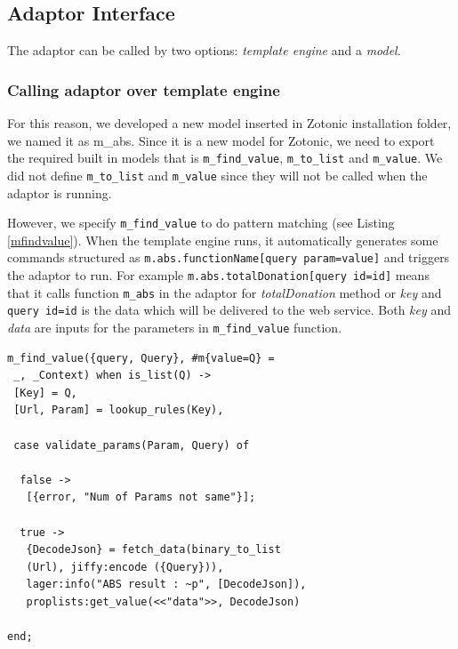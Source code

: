 \documentclass[conference]{IEEEtran}
\begin{document}
%

\subsection{Adaptor Interface}
The adaptor can be called by two options: \textit{template engine} and a \textit{model}. 

\subsubsection{Calling adaptor over template engine}
For this reason, we developed a new model inserted in Zotonic installation folder, we named it as m\_abs. Since it is a new model for Zotonic, we need to export the required built in models that is \texttt{m\_find\_value}, \texttt{m\_to\_list} and \texttt{m\_value}. We did not define \texttt{m\_to\_list} and \texttt{m\_value} since they will not be called when the adaptor is running.

However, we specify \texttt{m\_find\_value} to do pattern matching (see Listing \ref{mfindvalue}). When the template engine runs, it automatically generates some commands structured as \texttt{m.abs.functionName[{query param=value}]} and triggers the adaptor to run. For example \texttt{{{m.abs.totalDonation[{query id=id}]}}} means that it calls function \texttt{m\_abs} in the adaptor for \textit{totalDonation} method or \textit{key} and \texttt{{query id=id}} is the data which will be delivered to the web service. Both \textit{key} and \textit{data} are inputs for the parameters in \texttt{m\_find\_value} function.

\begin{lstlisting}[caption=Implementation of m\_find\_value function, label = mfindvalue]
m_find_value({query, Query}, #m{value=Q} =
 _, _Context) when is_list(Q) ->
 [Key] = Q,
 [Url, Param] = lookup_rules(Key),
 
 case validate_params(Param, Query) of
  
  false ->
   [{error, "Num of Params not same"}];
  
  true ->
   {DecodeJson} = fetch_data(binary_to_list
   (Url), jiffy:encode ({Query})),
   lager:info("ABS result : ~p", [DecodeJson]),
   proplists:get_value(<<"data">>, DecodeJson)

end;
\end{lstlisting}
\end{document}
